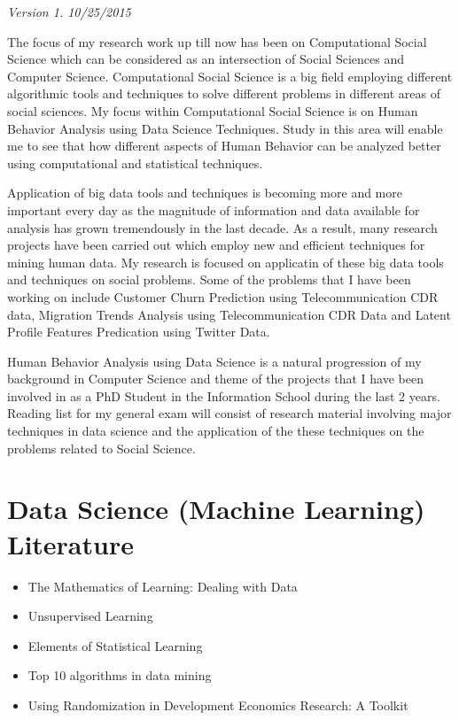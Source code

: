 \textit{Version 1. 10/25/2015} 

The focus of my research work up till now has been on Computational Social Science which can be considered as an intersection of Social Sciences and Computer Science. Computational Social Science is a big field employing different algorithmic tools and techniques to solve different problems in different areas of social sciences. My focus within Computational Social Science is on Human Behavior Analysis using Data Science Techniques. Study in this area will enable me to see that how different aspects of Human Behavior can be analyzed better using computational and statistical techniques.

Application of big data tools and techniques is becoming more and more important every day as the magnitude of information and data available for analysis has grown tremendously in the last decade. As a result, many research projects have been carried out which employ new and efficient techniques for mining human data. My research is focused on applicatin of these big data tools and techniques on social problems. Some of the problems that I have been working on include Customer Churn Prediction using Telecommunication CDR data, Migration Trends Analysis using Telecommunication CDR Data  and Latent Profile Features Predication using Twitter Data.

Human Behavior Analysis using Data Science is a natural progression of my background in Computer Science and theme of the projects that I have been involved in as a PhD Student in the Information School during the last 2 years. 
Reading list for my general exam will consist of research material involving major techniques in data science and the application of the these techniques on the problems related to Social Science. 

\section{Data Science (Machine Learning) Literature}
\begin{itemize}
\item The Mathematics of Learning: Dealing with Data\cite{Poggio_2005}
\end{itemize}
\begin{itemize}
\item Unsupervised Learning \cite{Ghahramani_2004}
\end{itemize}
\begin{itemize}
\item Elements of Statistical Learning\cite{2009}
\end{itemize}
\begin{itemize}
\item Top 10 algorithms in data mining \cite{2009}
\end{itemize}
\begin{itemize}
\item Using Randomization in Development Economics Research: A Toolkit \cite{Duflo} 
\end{itemize}
